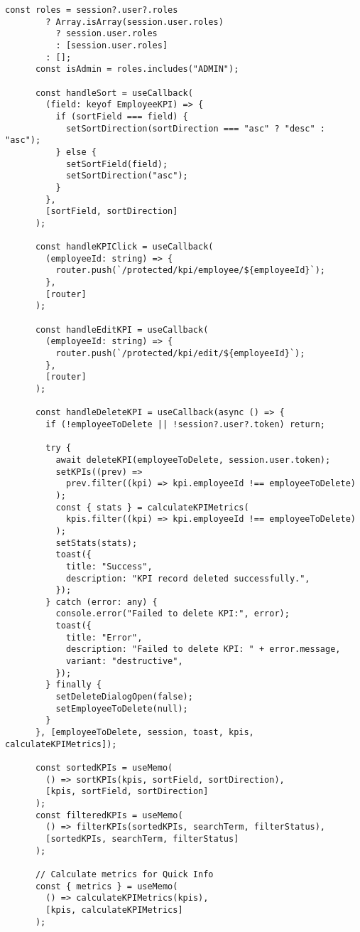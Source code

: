 \begin{lstlisting}[language=Golang, caption=Routes, frame=single]
      const roles = session?.user?.roles
        ? Array.isArray(session.user.roles)
          ? session.user.roles
          : [session.user.roles]
        : [];
      const isAdmin = roles.includes("ADMIN");
    
      const handleSort = useCallback(
        (field: keyof EmployeeKPI) => {
          if (sortField === field) {
            setSortDirection(sortDirection === "asc" ? "desc" : "asc");
          } else {
            setSortField(field);
            setSortDirection("asc");
          }
        },
        [sortField, sortDirection]
      );
    
      const handleKPIClick = useCallback(
        (employeeId: string) => {
          router.push(`/protected/kpi/employee/${employeeId}`);
        },
        [router]
      );
    
      const handleEditKPI = useCallback(
        (employeeId: string) => {
          router.push(`/protected/kpi/edit/${employeeId}`);
        },
        [router]
      );
    
      const handleDeleteKPI = useCallback(async () => {
        if (!employeeToDelete || !session?.user?.token) return;
    
        try {
          await deleteKPI(employeeToDelete, session.user.token);
          setKPIs((prev) =>
            prev.filter((kpi) => kpi.employeeId !== employeeToDelete)
          );
          const { stats } = calculateKPIMetrics(
            kpis.filter((kpi) => kpi.employeeId !== employeeToDelete)
          );
          setStats(stats);
          toast({
            title: "Success",
            description: "KPI record deleted successfully.",
          });
        } catch (error: any) {
          console.error("Failed to delete KPI:", error);
          toast({
            title: "Error",
            description: "Failed to delete KPI: " + error.message,
            variant: "destructive",
          });
        } finally {
          setDeleteDialogOpen(false);
          setEmployeeToDelete(null);
        }
      }, [employeeToDelete, session, toast, kpis, calculateKPIMetrics]);
    
      const sortedKPIs = useMemo(
        () => sortKPIs(kpis, sortField, sortDirection),
        [kpis, sortField, sortDirection]
      );
      const filteredKPIs = useMemo(
        () => filterKPIs(sortedKPIs, searchTerm, filterStatus),
        [sortedKPIs, searchTerm, filterStatus]
      );
    
      // Calculate metrics for Quick Info
      const { metrics } = useMemo(
        () => calculateKPIMetrics(kpis),
        [kpis, calculateKPIMetrics]
      );
    

\end{lstlisting}
